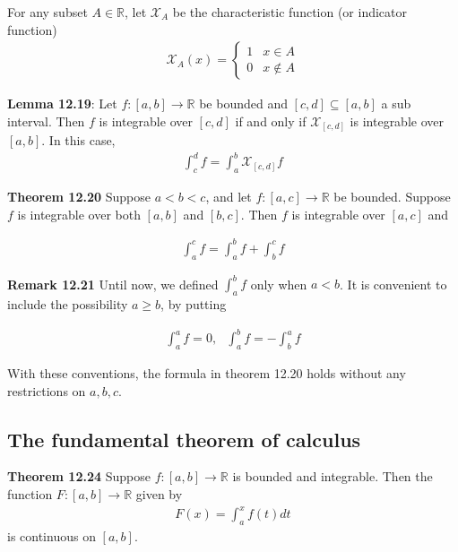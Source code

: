\documentclass[11pt]{article}
\begin{document}
For any subset $A \in \mathbb{R}$, let $\mathcal{X}_A$ be the characteristic function (or indicator function)
\begin{align*}
    \mathcal{X}_A (x) = 
    \begin{cases}
    1 & x \in A \\
    0 & x \notin A
    \end{cases}
\end{align*} 

\textbf{Lemma 12.19}: Let $f:[a,b] \to \mathbb{R}$ be bounded and $[c,d] \subseteq [a,b]$ a sub interval. Then $f$ is integrable over $[c,d]$ if and only if $\mathcal{X}_{[c,d]}$ is integrable over $[a,b]$. In this case, 
\begin{align*}
    \int_c^d f = \int_a^b \mathcal{X}_{[c,d]} f
\end{align*}

\textbf{Theorem  12.20} Suppose $a < b< c$, and let $f: [a,c] \to \mathbb{R}$ be bounded. Suppose $f$ is integrable over both $[a,b] $ and $[b,c]$. Then $f$ is integrable over $[a,c]$ and 

\begin{align*}
    \int_a^c f = \int_a^b f + \int_b^c f
\end{align*}

\textbf{Remark 12.21} Until now, we defined $\int_a^b f$ only when $a <b$. It is convenient to include the possibility $ a \geq b$, by putting 

\begin{align*}
    \int_a^a f = 0, ~~~ \int_a^b f = - \int_b^a f \tag{if $a >b$}
\end{align*} 

With these conventions, the formula in theorem 12.20 holds without any restrictions on $a,b,c$.  

\newpage

\begin{center}
    \section*{The fundamental theorem of calculus}
\end{center}

\textbf{Theorem 12.24} Suppose $f: [a,b] \to \mathbb{R}$ is bounded and integrable. Then the function $F: [a,b] \to \mathbb{R}$ given by 
\begin{align*}
    F(x) = \int_a^x f(t) dt 
\end{align*}
is continuous on $[a,b]$. 
\end{document}

